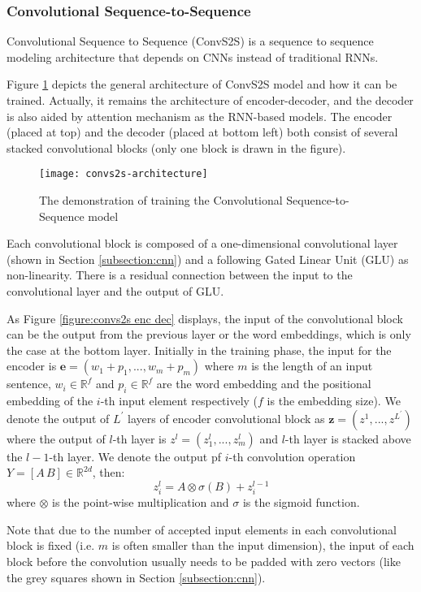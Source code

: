 \subsubsection*{Convolutional Sequence-to-Sequence}

Convolutional Sequence to Sequence (ConvS2S) \cite{gehring2017convs2s} is a sequence to sequence modeling architecture that depends on CNNs instead of traditional RNNs. 

Figure \ref{figure:convs2s model} depicts the general architecture of ConvS2S model and how it can be trained. Actually, it remains the architecture of encoder-decoder, and the decoder is also aided by attention mechanism as the RNN-based models. The encoder (placed at top) and the decoder (placed at bottom left) both consist of several stacked convolutional blocks (only one block is drawn in the figure).
\begin{figure}[h]
\texttt{[image: convs2s-architecture]}
\centering
\caption{The demonstration of training the Convolutional Sequence-to-Sequence model \cite{gehring2017convs2s}}
\label{figure:convs2s model}
\end{figure}
Each convolutional block is composed of a one-dimensional convolutional layer (shown in Section \ref{subsection:cnn}) and a following Gated Linear Unit (GLU) as non-linearity. There is a residual connection between the input to the convolutional layer and the output of GLU.


As Figure \ref{figure:convs2s enc dec} displays, the input of the convolutional block can be the output from the previous layer or the word embeddings, which is only the case at the bottom layer. Initially in the training phase, the input for the encoder is $ \textbf{e} = (w_{1}+p_{1},...,w_{m}+p_{m}) $ where $ m $ is the length of an input sentence, $ w_{i} \in \mathbb{R}^{f} $ and $ p_{i} \in \mathbb{R}^{f} $ are the word embedding and the positional embedding of the $ i $-th input element respectively ($ f $ is the embedding size). We denote the output of $ L^{'} $ layers of encoder convolutional block as $ \textbf{z} = (z^{1},...,z^{L^{'}}) $ where the output of $ l $-th layer is $ z^{l} = (z_{1}^{l},...,z_{m}^{l}) $ and $ l $-th layer is stacked above the $ l-1 $-th layer. We denote the output pf $ i $-th convolution operation $ Y = [A\,B] \in \mathbb{R}^{2d} $, then:
\[ z_{i}^{l} = A \otimes \sigma(B) + z_{i}^{l-1} \]
where $ \otimes $ is the point-wise multiplication and $ \sigma $ is the sigmoid function.

Note that due to the number of accepted input elements in each convolutional block is fixed (i.e. $ m $ is often smaller than the input dimension), the input of each block before the convolution usually needs to be padded with zero vectors (like the grey squares shown in Section \ref{subsection:cnn}).
 
